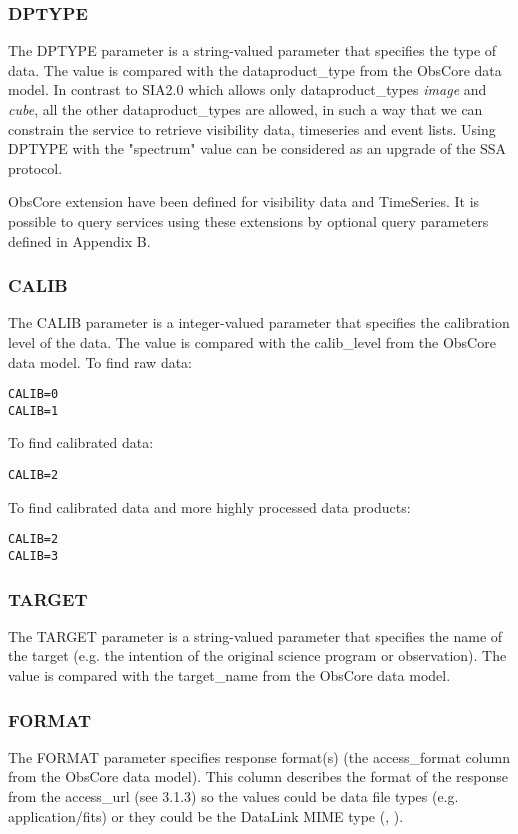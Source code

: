 \documentclass[11pt,a4paper]{ivoa}
\begin{document}
\subsubsection{DPTYPE}
The DPTYPE parameter is a string-valued parameter that specifies the type of data. The value is compared with the dataproduct\_type from the ObsCore data model.  In contrast to SIA2.0 which allows only dataproduct\_types  \textit{image} and \textit{cube}, all the other dataproduct\_types are allowed, in such a way that we can constrain the service to retrieve visibility data, timeseries and event lists. Using DPTYPE with the "spectrum" value can be considered as an upgrade of the SSA protocol.

ObsCore extension have been defined for visibility data and TimeSeries. It is possible to query services using these extensions by optional query parameters defined in Appendix B.

\subsubsection{CALIB}
The CALIB parameter is a integer-valued parameter that specifies the calibration level of the data. The value is compared with the calib\_level from the ObsCore data model. To find raw data:

\begin{lstlisting}
CALIB=0
CALIB=1
\end{lstlisting}
To find calibrated data:

\begin{lstlisting}
CALIB=2
\end{lstlisting}
To find calibrated data and more highly processed data products:

\begin{lstlisting}
CALIB=2
CALIB=3
\end{lstlisting}

\subsubsection{TARGET}
The TARGET parameter is a string-valued parameter that specifies the name of the target (e.g. the intention of the original science program or observation). The value is compared with the target\_name from the ObsCore data model.

\subsubsection{FORMAT}
The FORMAT parameter specifies response format(s)  (the access\_format column from the ObsCore data model). This column describes the format of the response from the access\_url (see 3.1.3) so the values could be data file types (e.g. application/fits) or they could be the DataLink  MIME type (\cite{std:DataLink}, \cite{std:TSV}).  
\end{document}
